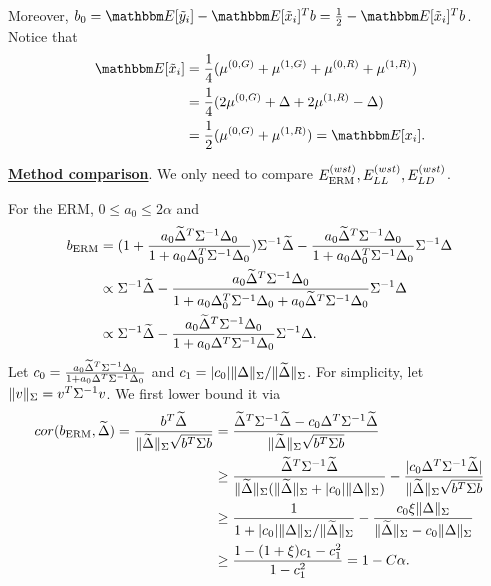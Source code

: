 Moreover, $b_0=\E[\ty_i]-\E[\tx_i]^Tb=\frac{1}{2}-\E[\tx_i]^Tb$.
Notice that
\begin{align*}
    \E[\tx_i]&=\frac{1}{4}(\mu^{(0,G)}+\mu^{(1,G)}+\mu^{(0,R)}+\mu^{(1,R)})\\
    &=\frac{1}{4}(2\mu^{(0,G)}+\Delta+2\mu^{(1,R)}-\Delta)\\
    &=\frac{1}{2}(\mu^{(0,G)}+\mu^{(1,R)})=\E[x_i].
\end{align*}



\underline{\textbf{Method comparison}}.
We only need to compare $E^{(wst)}_{\textup{ERM}}, E^{(wst)}_{LL}, E^{(wst)}_{LD}$.  

For the ERM, $0\leq a_0\leq 2\alpha$ and 
\begin{align*}
b_{\textup{ERM}}&=(1+\frac{a_0\widetilde{\Delta}^T\Sigma^{-1}\Delta_0}{1+a_0\Delta_0^T\Sigma^{-1}\Delta_0})\Sigma^{-1}\widetilde{\Delta}-\frac{a_0\widetilde{\Delta}^T\Sigma^{-1}\Delta_0}{1+a_0\Delta_0^T\Sigma^{-1}\Delta_0}\Sigma^{-1}\Delta\\
&\propto \Sigma^{-1}\widetilde{\Delta}-\frac{a_0\widetilde{\Delta}^T\Sigma^{-1}\Delta_0}{1+a_0\Delta_0^T\Sigma^{-1}\Delta_0+a_0\widetilde{\Delta}^T\Sigma^{-1}\Delta_0}\Sigma^{-1}\Delta\\
&\propto \Sigma^{-1}\widetilde{\Delta}-\frac{a_0\widetilde{\Delta}^T\Sigma^{-1}\Delta_0}{1+a_0\Delta^T\Sigma^{-1}\Delta_0}\Sigma^{-1}\Delta.
\end{align*}
Let $c_0=\frac{a_0\widetilde{\Delta}^T\Sigma^{-1}\Delta_0}{1+a_0\Delta^T\Sigma^{-1}\Delta_0}$ and $c_1=|c_0|\|\Delta\|_{\Sigma}/\|\widetilde{\Delta}\|_{\Sigma}$. For simplicity, let $\|v\|_{\Sigma}=v^T\Sigma^{-1}v$. We first lower bound it via
\begin{align*}
  cor(b_{\textup{ERM}},\widetilde{\Delta})=   \frac{b^T\widetilde{\Delta}}{\|\widetilde{\Delta}\|_{\Sigma}\sqrt{b^T\Sigma b}}&=\frac{\widetilde{\Delta}^T\Sigma^{-1}\widetilde{\Delta}-c_0\Delta^T\Sigma^{-1}\widetilde{\Delta}}{\|\widetilde{\Delta}\|_{\Sigma}\sqrt{b^T\Sigma b}}\\
    &\geq \frac{\widetilde{\Delta}^T\Sigma^{-1}\widetilde{\Delta}}{\|\widetilde{\Delta}\|_{\Sigma}(\|\widetilde{\Delta}\|_{\Sigma}+|c_0|\|\Delta\|_{\Sigma})}-\frac{|c_0\Delta^T\Sigma^{-1}\widetilde{\Delta}|}{\|\widetilde{\Delta}\|_{\Sigma}\sqrt{b^T\Sigma b}}\\
    &\geq \frac{1}{1+|c_0|\|\Delta\|_{\Sigma}/\|\widetilde{\Delta}\|_{\Sigma}}-\frac{c_0\xi\|\Delta\|_{\Sigma}}{\|\widetilde{\Delta}\|_{\Sigma}-c_0\|\Delta\|_{\Sigma}}\\
    &\geq \frac{1-(1+\xi)c_1-c_1^2}{1-c_1^2}=1-C\alpha.
\end{align*}

